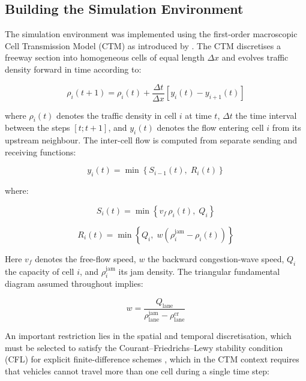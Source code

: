 
\subsection{Building the Simulation Environment}

The simulation environment was implemented using the first-order macroscopic
Cell Transmission Model (CTM) as introduced by \cite{CTM}. The CTM discretises
a freeway section into homogeneous cells of equal length $\Delta x$ and evolves
traffic density forward in time according to:

\begin{equation}
    \rho_i(t+1)
    =
    \rho_i(t)
    +
    \frac{\Delta t}{\Delta x}
    \left[
    y_i(t) - y_{i+1}(t)
    \right]
\end{equation}

where $\rho_i(t)$ denotes the traffic density in cell $i$ at time $t$, $\Delta t$ the time interval between the steps $[t;t+1]$, and
$y_i(t)$ denotes the flow entering cell $i$ from its upstream neighbour.
The inter-cell flow is computed from separate sending and receiving functions:

\begin{equation}
    y_i(t) = \min\!\left\{ S_{i-1}(t),\; R_i(t) \right\}
\end{equation}

where:

\begin{equation}
    S_{i}(t) = \min\!\left\{ v_f\,\rho_{i}(t),\; Q_{i} \right\}
\end{equation}

\begin{equation}
    R_i(t) = \min\!\left\{ Q_i,\; w\!\left( \rho_i^{\mathrm{jam}} - \rho_i(t) \right) \right\}
\end{equation}

Here $v_f$ denotes the free-flow speed, $w$ the backward congestion-wave speed,
$Q_i$ the capacity of cell $i$, and $\rho_i^{\mathrm{jam}}$ its jam density.
The triangular fundamental diagram assumed throughout implies:

\begin{equation}
    w = \frac{Q_{\mathrm{lane}}}{\rho^{\mathrm{jam}}_{\mathrm{lane}} - \rho^{\mathrm{cr}}_{\mathrm{lane}}}
\end{equation}

An important restriction lies in the spatial and temporal discretisation, which must be selected to satisfy the
Courant--Friedrichs--Lewy stability condition (CFL) for explicit finite-difference
schemes \citep{CFL}, which in the CTM context requires that vehicles cannot
travel more than one cell during a single time step:

